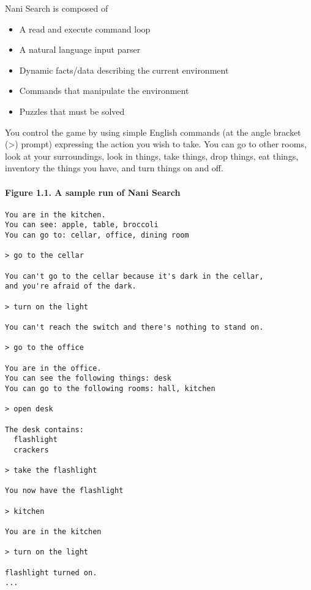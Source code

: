 
Nani Search is composed of
\begin{itemize}[nosep]
  \item 
A read and execute command loop
  \item 
A natural language input parser
  \item 
Dynamic facts/data describing the current environment
  \item 
Commands that manipulate the environment
  \item 
Puzzles that must be solved
\end{itemize}

You control the game by using simple English commands (at the angle bracket (>)
prompt) expressing the action you wish to take. You can go to other rooms, look
at your surroundings, look in things, take things, drop things, eat things,
inventory the things you have, and turn things on and off.

\paragraph{Figure 1.1. A sample run of Nani Search}
\begin{verbatim}
You are in the kitchen.
You can see: apple, table, broccoli
You can go to: cellar, office, dining room

> go to the cellar

You can't go to the cellar because it's dark in the cellar,
and you're afraid of the dark.

> turn on the light

You can't reach the switch and there's nothing to stand on.

> go to the office

You are in the office.
You can see the following things: desk
You can go to the following rooms: hall, kitchen

> open desk

The desk contains:
  flashlight
  crackers

> take the flashlight

You now have the flashlight

> kitchen

You are in the kitchen

> turn on the light

flashlight turned on.
...
\end{verbatim}

